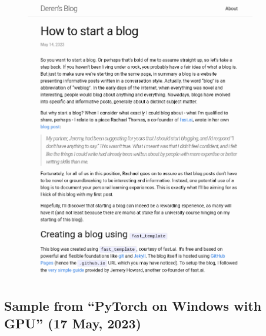 \begin{figure}[!ht]
    \centering
    \includegraphics[width=0.9\textwidth]{images/q1_sample_of_post_1.png}
\end{figure}

\newpage

\subsection*{Sample from ``PyTorch on Windows with GPU'' (17 May, 2023)}

